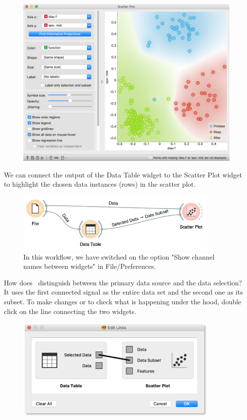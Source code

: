 \begin{figure}
  \centering
  \includegraphics[width=\linewidth]{scatterplot-brown.png}
  \label{fig:workflow-scatterplot}
\end{figure}

We can connect the output of the Data Table widget to the Scatter Plot widget to highlight the chosen data instances (rows) in the scatter plot.

\begin{figure}
  \includegraphics[width=100mm]{workflow-fig5.png}
  \caption{In this workflow, we have switched on the option "Show channel names between widgets" in File/Preferences.}
  \label{fig:workflow-fig5}
\end{figure}

How does \mutation\ distinguish between the primary data source and the data selection? It uses the first connected signal as the entire data set and the second one as its subset. To make changes or to check what is happening under the hood, double click on the line connecting the two widgets.
\newpage

\begin{figure}[h]
  \flushright
  \includegraphics[width=100mm]{workflow-fig6.png}
\label{fig:workflow-fig6}%
\end{figure}

